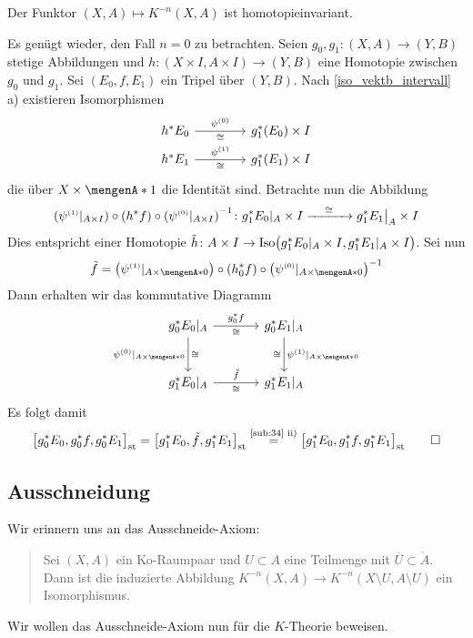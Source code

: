 \begin{lemma}[label=sub:36]
Der Funktor $(X,A) \mapsto K^{-n}(X,A)$ ist homotopieinvariant.
\end{lemma}
\begin{beweis}
Es genügt wieder, den Fall $n=0$ zu betrachten. Seien $g_0,g_1 \colon (X,A) \to (Y,B)$ stetige Abbildungen und $h \colon (X \times I,A \times I) \to (Y,B)$ eine Homotopie 
zwischen $g_0$ und $g_1$. Sei $(E_0,f,E_1)$ ein Tripel über $(Y,B)$. Nach \autoref{iso_vektb_intervall} a) existieren Isomorphismen
\[
	\begin{tikzcd}[column sep=4em, row sep=0.5em]
		h^* E_0 \rar["\psi^\ssbrace{0}","\cong"'] & g_1^*(E_0) \times I \\
		h^* E_1 \rar["\psi^\ssbrace{1}","\cong"'] & g_1^*(E_1) \times I
	\end{tikzcd}
\]
die über $X \times \set{1}$ die Identität sind. Betrachte nun die Abbildung
\[
	\enbrace*{\psi^\ssbrace{1}|_{A \times I}} \circ \enbrace*{h^* f} \circ \enbrace*{\psi^\ssbrace{0}|_{A \times I}} ^{-1} \colon g^*_1 E_0|_A \times I  
	\xrightarrow{\minwidthbox{\cong}{3em}} g_1^*E_1\big|_A \times I   
\]
Dies entspricht einer Homotopie $\tilde{h} \colon A \times I \to \Iso \enbrace[\big]{g_1^*E_0|_A \times I, g_1^* E_1|_A \times I}$. 
Sei nun
\[
	\tilde{f} = \enbrace*{\psi^\ssbrace{1}|_{A \times \set{0}}} \circ \enbrace*{h^*_0 f} \circ \enbrace*{\psi^\ssbrace{0}|_{A \times \set{0}}} ^{-1}
\]  
Dann erhalten wir das kommutative Diagramm
\[
	\begin{tikzcd}[sep=large]
		g_0^* E_0|_A \rar["g_0^*f","\cong"'] \dar["\psi^\ssbrace{0}|_{A \times \set{0}}"',"\cong"] & g_0^*E_1|_A \dar["\psi^\ssbrace{1}|_{A \times \set{0} }","\cong"'] \\
		g^*_1 E_0|_A \rar["\cong"',"\tilde{f}"] & g_1^* E_1|_A
	\end{tikzcd}
\]
Es folgt damit
\[
	\benbrace[\big]{g_0^* E_0, g^*_0 f , g^*_0 E_1}_\st = \benbrace[\big]{g_1^* E_0, \tilde{f}, g_1^* E_1}_\st \stackrel{\mbox{\scriptsize \ref{sub:34} ii)}}{=}
	\benbrace[\big]{g_1^* E_0, g_1^* f, g_1^* E_1}_\st \qedhere
\]	
\end{beweis}

\subsection*{Ausschneidung}
Wir erinnern uns an das Ausschneide-Axiom:
\begin{quote}
Sei $(X,A)$ ein Ko-Raumpaar und $U \subset A$ eine Teilmenge mit $\overline{U} \subset \mathring{A}$. Dann ist die induzierte Abbildung 
$K^{-n}(X,A) \to K^{-n}(X \setminus U, A \setminus U)$ ein Isomorphismus.	
\end{quote}
Wir wollen das Ausschneide-Axiom nun für die $K$-Theorie beweisen.

